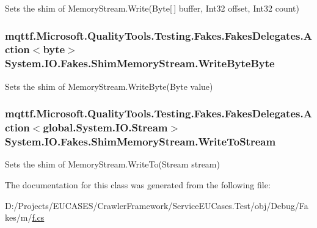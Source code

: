 Sets the shim of Memory\-Stream.\-Write(\-Byte\mbox{[}$\,$\mbox{]} buffer, Int32 offset, Int32 count)

\hypertarget{class_system_1_1_i_o_1_1_fakes_1_1_shim_memory_stream_aa70f0446d11a0d92f72f33d52dc60bec}{
\subsubsection[{Write\-Byte\-Byte}]{\setlength{\rightskip}{0pt plus 5cm}mqttf.\-Microsoft.\-Quality\-Tools.\-Testing.\-Fakes.\-Fakes\-Delegates.\-Action$<$byte$>$ System.\-I\-O.\-Fakes.\-Shim\-Memory\-Stream.\-Write\-Byte\-Byte\hspace{0.3cm}{\ttfamily [set]}}}\label{class_system_1_1_i_o_1_1_fakes_1_1_shim_memory_stream_aa70f0446d11a0d92f72f33d52dc60bec}


Sets the shim of Memory\-Stream.\-Write\-Byte(\-Byte value)

\hypertarget{class_system_1_1_i_o_1_1_fakes_1_1_shim_memory_stream_a0f8c9678be4ffed1e7dfdb0d82804b43}{
\subsubsection[{Write\-To\-Stream}]{\setlength{\rightskip}{0pt plus 5cm}mqttf.\-Microsoft.\-Quality\-Tools.\-Testing.\-Fakes.\-Fakes\-Delegates.\-Action$<$global.\-System.\-I\-O.\-Stream$>$ System.\-I\-O.\-Fakes.\-Shim\-Memory\-Stream.\-Write\-To\-Stream\hspace{0.3cm}{\ttfamily [set]}}}\label{class_system_1_1_i_o_1_1_fakes_1_1_shim_memory_stream_a0f8c9678be4ffed1e7dfdb0d82804b43}


Sets the shim of Memory\-Stream.\-Write\-To(\-Stream stream)



The documentation for this class was generated from the following file\-:\begin{DoxyCompactItemize}
\item 
D\-:/\-Projects/\-E\-U\-C\-A\-S\-E\-S/\-Crawler\-Framework/\-Service\-E\-U\-Cases.\-Test/obj/\-Debug/\-Fakes/m/\hyperlink{m_2f_8cs}{f.\-cs}\end{DoxyCompactItemize}
